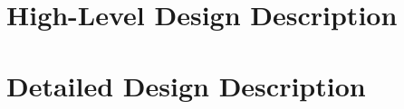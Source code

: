 \documentclass[12pt,a4paper,titlepage,oneside]{article}
\begin{document}
\MakeTitleAndTOC
  \newpage


\section{High-Level Design Description}

\section{Detailed Design Description}
\end{document}
